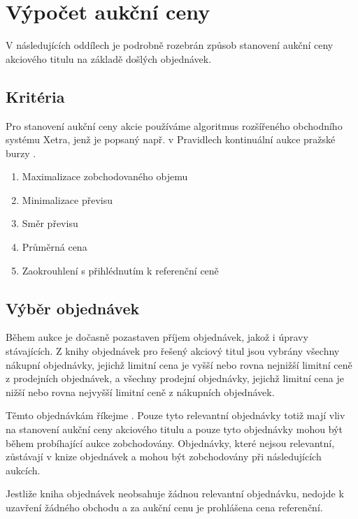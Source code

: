 \documentclass[thesis=M,czech]{FITthesis}[2012/06/26]
\begin{document}

\section{Výpočet aukční ceny}

V následujících oddílech je podrobně rozebrán způsob stanovení aukční ceny akciového titulu na základě došlých objednávek.


\subsection{Kritéria}
\label{sec:strikercrit}

Pro stanovení aukční ceny akcie používáme algoritmus rozšířeného obchodního systému Xetra, jenž je popsaný např. v Pravidlech kontinuální 
aukce pražské burzy \cite{psekont}. 

\begin{enumerate}
	\item Maximalizace zobchodovaného objemu
	\item Minimalizace převisu 
	\item Směr převisu
	\item Průměrná cena
	\item Zaokrouhlení s přihlédnutím k referenční ceně
\end{enumerate}


\subsection{Výběr objednávek}
\label{sec:strikerorders}

Během aukce je dočasně pozastaven příjem objednávek, jakož i úpravy stávajících. Z knihy objednávek pro řešený akciový 
titul jsou vybrány všechny nákupní objednávky, jejichž limitní cena je vyšší nebo rovna nejnižší limitní ceně z prodejních
objednávek, a všechny prodejní objednávky, jejichž limitní cena je nižší nebo rovna nejvyšší limitní ceně z nákupních objednávek.

Těmto objednávkám říkejme . Pouze tyto relevantní objednávky totiž mají vliv na stanovení aukční ceny akciového 
titulu a pouze tyto objednávky mohou být během probíhající aukce zobchodovány. Objednávky, které nejsou relevantní, zůstávají 
v knize objednávek a mohou být zobchodovány při následujících aukcích.

Jestliže kniha objednávek neobsahuje žádnou relevantní objednávku, nedojde k uzavření žádného obchodu a za aukční 
cenu je prohlášena cena referenční.
\end{document}
